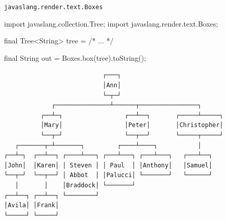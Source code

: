 \begin{frame}{\texttt{javaslang.render.text.Boxes}}
  \footnotesize
\begin{pygmented}[]
import javaslang.collection.Tree;
import javaslang.render.text.Boxes;

final Tree<String> tree = /* ... */

final String out = Boxes.box(tree).toString();
\end{pygmented}

\begin{verbatim}
                           ┌───┐                            
                           │Ann│                            
                           └─┬─┘                            
             ┌───────────────┴──────┬────────────────┐      
          ┌──┴─┐                 ┌──┴──┐       ┌─────┴─────┐
          │Mary│                 │Peter│       │Christopher│
          └──┬─┘                 └──┬──┘       └─────┬─────┘
   ┌───────┬─┴───────┐         ┌────┴────┐           │      
┌──┴─┐  ┌──┴──┐ ┌────┴───┐ ┌───┴───┐ ┌───┴───┐   ┌───┴──┐   
│John│  │Karen│ │ Steven │ │ Paul  │ │Anthony│   │Samuel│   
└──┬─┘  └──┬──┘ │ Abbot  │ │Palucci│ └───────┘   └──────┘   
   │       │    │Braddock│ └───────┘                        
┌──┴──┐ ┌──┴──┐ └────────┘                                  
│Avila│ │Frank│                                             
└─────┘ └─────┘                                             
\end{verbatim}
\end{frame}



